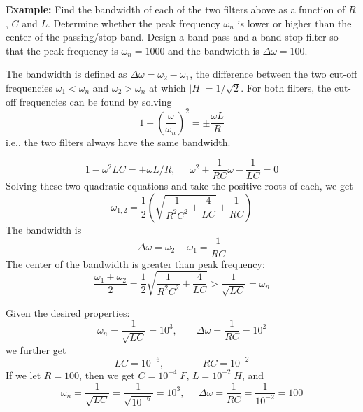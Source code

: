 \documentclass{article}
\begin{document}
{\bf Example:} Find the bandwidth of each of the two filters above as 
a function of $R$, $C$ and $L$. Determine whether the peak frequency
$\omega_n$ is lower or higher than the center of the passing/stop
band. Design a band-pass and a band-stop filter so that the peak
frequency is $\omega_n=1000$ and the bandwidth is $\Delta\omega=100$.

The bandwidth is defined as $\Delta\omega=\omega_2-\omega_1$, the
difference between the two cut-off frequencies $\omega_1<\omega_n$ 
and $\omega_2>\omega_n$ at which $|H|=1/\sqrt{2}$. For both filters,
the cut-off frequencies can be found by solving
\begin{equation}
  1-\left(\frac{\omega}{\omega_n}\right)^2 =\pm \frac{\omega L}{R}
\end{equation}
i.e., the two filters always have the same bandwidth.

\begin{equation}
  1-\omega^2LC=\pm \omega L/R,\;\;\;\;\;
  \omega^2\pm\frac{1}{RC}\omega-\frac{1}{LC}=0
\end{equation}
Solving these two quadratic equations and take the positive roots
of each, we get
\begin{equation}
  \omega_{1,2}=\frac{1}{2}\left(\sqrt{\frac{1}{R^2C^2}+\frac{4}{LC}}\pm
  \frac{1}{RC}\right)
\end{equation}
The bandwidth is
\begin{equation}
  \Delta\omega=\omega_2-\omega_1=\frac{1}{RC}
\end{equation}
The center of the bandwidth is greater than peak frequency:
\begin{equation}
  \frac{\omega_1+\omega_2}{2}=\frac{1}{2}\sqrt{\frac{1}{R^2C^2}+\frac{4}{LC}}
  >\frac{1}{\sqrt{LC}}=\omega_n
\end{equation}

Given the desired properties:
\begin{equation}
  \omega_n=\frac{1}{\sqrt{LC}}=10^3,\;\;\;\;\;\;\;\Delta\omega=\frac{1}{RC}=10^2
\end{equation}
we further get
\begin{equation}
  LC=10^{-6},\;\;\;\;\;\;\;\;\;\;\;\;\;\;RC=10^{-2}
\end{equation}
If we let $R=100$, then we get $C=10^{-4}\;F$, $L=10^{-2}\;H$, 
and
\begin{equation}
  \omega_n=\frac{1}{\sqrt{LC}}=\frac{1}{\sqrt{10^{-6}}}=10^3,
  \;\;\;\;\;
  \Delta\omega=\frac{1}{RC}=\frac{1}{10^{-2}}=100
\end{equation}
\end{document}
